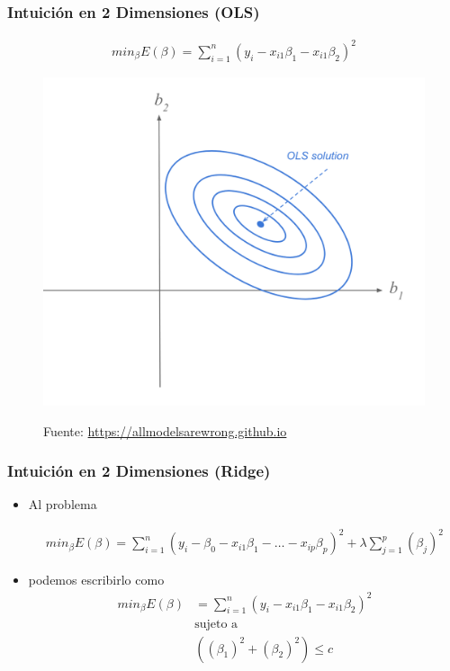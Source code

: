 \documentclass[
  shownotes,
  xcolor={svgnames},
  hyperref={colorlinks,citecolor=DarkBlue,linkcolor=DarkRed,urlcolor=DarkBlue}
  , aspectratio=169]{beamer}
\begin{document}
\begin{frame}[fragile]
\frametitle{Intuición en 2 Dimensiones (OLS)}

\begin{align}
min_{\beta} E(\beta) = \sum_{i=1}^n (y_i - x_{i1}\beta_1 - x_{i1}\beta_2)^2 
\end{align}

\begin{figure}[H] \centering
            \captionsetup{justification=centering}
              \includegraphics[scale=0.3]{figures/ols2}
 
\tiny
Fuente: \url{https://allmodelsarewrong.github.io}
\end{figure}


\end{frame}
\begin{frame}[fragile]
\frametitle{Intuición en 2 Dimensiones (Ridge)}

\begin{itemize}
\item Al problema

  \begin{align}
  min_{\beta} E(\beta) = \sum_{i=1}^n (y_i-\beta_0 - x_{i1}\beta_1 - \dots - x_{ip}\beta_p)^2 + \lambda \sum_{j=1}^p (\beta_j)^2
  \end{align}
\medskip 
\item podemos escribirlo como
  \begin{align}
     min_{\beta} E(\beta) &= \sum_{i=1}^n (y_i - x_{i1}\beta_1 - x_{i1}\beta_2)^2  \\ \nonumber
     & \text{sujeto a}   \\
     & \left( (\beta_1)^2 + (\beta_2)^2 \right) \leq c \nonumber
  \end{align}

\end{itemize}

\end{frame}
\end{document}
